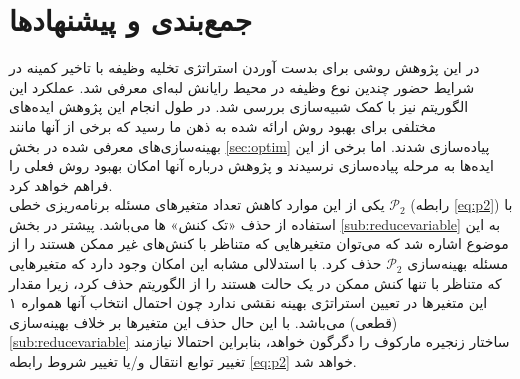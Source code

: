 \chapter{جمع‌بندی و پیشنهاد‌ها}
در این پژوهش روشی برای بدست آوردن استراتژی تخلیه وظیفه با تاخیر کمینه در شرایط حضور چندین نوع وظیفه در محیط رایانش لبه‌ای معرفی شد. عملکرد این الگوریتم نیز با کمک شبیه‌سازی بررسی شد. در طول انجام این پژوهش ایده‌های مختلفی برای بهبود روش ارائه شده به ذهن ما رسید که برخی از آنها مانند بهینه‌سازی‌های معرفی شده در بخش \ref{sec:optim} پیاده‌سازی شدند. اما برخی از این ایده‌ها به مرحله پیاده‌سازی نرسیدند و پژوهش درباره آنها امکان بهبود روش فعلی را فراهم خواهد کرد. \\

یکی از این موارد کاهش تعداد متغیرهای مسئله برنامه‌ریزی خطی
$\mathcal{P}_2$
(رابطه \ref{eq:p2})
 با استفاده از حذف «تک کنش» ها می‌باشد. پیشتر در بخش \ref{sub:reducevariable} به این موضوع اشاره شد که می‌توان متغیرهایی که متناظر با کنش‌های غیر ممکن هستند را از مسئله بهینه‌سازی 
 $\mathcal{P}_2$
 حذف کرد. با استدلالی مشابه این امکان وجود دارد که متغیرهایی که متناظر با تنها کنش ممکن در یک حالت هستند را از الگوریتم حذف کرد، زیرا مقدار این متغیرها در تعیین استراتژی بهینه نقشی ندارد چون احتمال انتخاب آنها همواره ۱ (قطعی) می‌باشد. با این حال حذف این متغیرها بر خلاف بهینه‌سازی \ref{sub:reducevariable} ساختار زنجیره مارکوف را دگرگون خواهد، بنابراین احتمالا نیازمند تغییر توابع انتقال و/یا تغییر شروط رابطه \ref{eq:p2} خواهد شد.
\clearpage